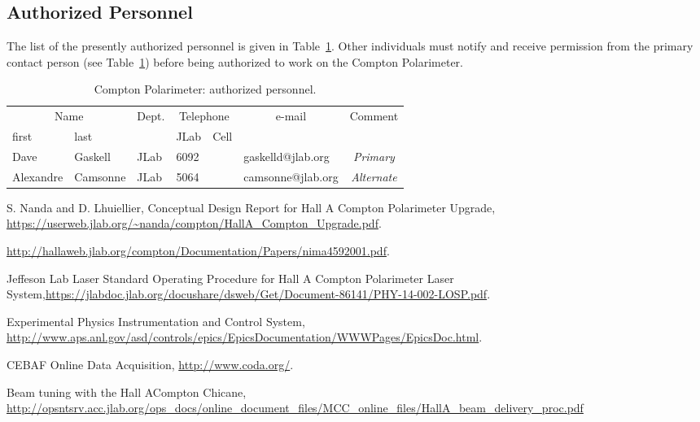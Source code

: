 \subsection{Authorized Personnel}
The list
of the presently authorized personnel is given in Table~\ref{tab:compton:personnel}.
Other individuals must notify and receive permission from
the primary contact person (see Table~\ref{tab:compton:personnel}) before being authorized to work on the Compton Polarimeter.

\begin{table}[ht]
\begin{center}
\begin{tabular}{|ll|l|l|l|l|c|} \hline
  \multicolumn{2}{|c|}{Name} & Dept. & \multicolumn{2}{c|}{Telephone} &
  \multicolumn{1}{c|}{e-mail} & Comment \\
  \cline{4-5}
    first & last & & JLab &  Cell&  & \\
\hline
 {Dave } & {Gaskell} & JLab   & 6092  &   & gaskelld@jlab.org     & \it Primary     \\
   Alexandre & Camsonne           & JLab   & 5064 &  & camsonne@jlab.org     & \it Alternate \\
 \hline
\end{tabular}  
\end{center}
\caption[compton Polarimeter: authorized personnel]{
   Compton Polarimeter: authorized personnel. }
\label{tab:compton:personnel}
\end{table}

%
\begin{thebibliography}{99}
 S. Nanda and D. Lhuiellier, Conceptual Design Report  for 
Hall A Compton Polarimeter Upgrade, \url{https://userweb.jlab.org/~nanda/compton/HallA_Compton_Upgrade.pdf}.

 \url{http://hallaweb.jlab.org/compton/Documentation/Papers/nima4592001.pdf}.

 Jeffeson Lab Laser Standard Operating Procedure for Hall A Compton Polarimeter Laser System,\url{https://jlabdoc.jlab.org/docushare/dsweb/Get/Document-86141/PHY-14-002-LOSP.pdf}.

 Experimental Physics Instrumentation and Control System, \url{http://www.aps.anl.gov/asd/controls/epics/EpicsDocumentation/WWWPages/EpicsDoc.html}.

 CEBAF Online Data Acquisition, \url{http://www.coda.org/}.

 Beam tuning with the Hall ACompton Chicane,
\url{http://opsntsrv.acc.jlab.org/ops\_docs/online\_document_files/MCC\_online\_files/HallA\_beam\_delivery\_proc.pdf}
\end{thebibliography}


